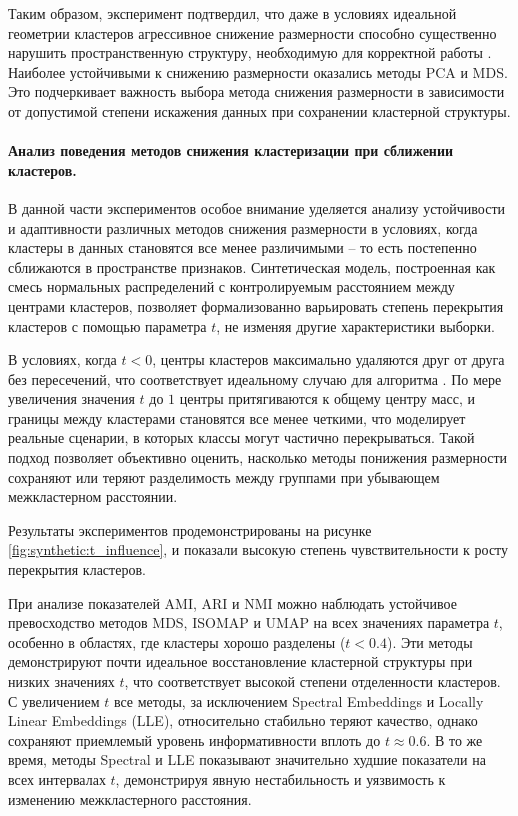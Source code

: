                 Таким образом, эксперимент подтвердил, что даже в условиях идеальной геометрии кластеров агрессивное снижение размерности способно существенно нарушить пространственную структуру, необходимую для корректной работы \kmeans{}. Наиболее устойчивыми к снижению размерности оказались методы PCA и MDS. Это подчеркивает важность выбора метода снижения размерности в зависимости от допустимой степени искажения данных при сохранении кластерной структуры.

            \paragraph{Анализ поведения методов снижения кластеризации при сближении кластеров.}
                В данной части экспериментов особое внимание уделяется анализу устойчивости и адаптивности различных методов снижения размерности в условиях, когда кластеры в данных становятся все менее различимыми -- то есть постепенно сближаются в пространстве признаков. Синтетическая модель, построенная как смесь нормальных распределений с контролируемым расстоянием между центрами кластеров, позволяет формализованно варьировать степень перекрытия кластеров с помощью параметра \(t\), не изменяя другие характеристики выборки.

                В условиях, когда \(t < 0\), центры кластеров максимально удаляются друг от друга без пересечений, что соответствует идеальному случаю для алгоритма \kmeans{}. По мере увеличения значения \(t\) до \(1\) центры притягиваются к общему центру масс, и границы между кластерами становятся все менее четкими, что моделирует реальные сценарии, в которых классы могут частично перекрываться. Такой подход позволяет объективно оценить, насколько методы понижения размерности сохраняют или теряют разделимость между группами при убывающем межкластерном расстоянии.

                Результаты экспериментов продемонстрированы на рисунке \ref{fig:synthetic:t_influence}, и показали высокую степень чувствительности к росту перекрытия кластеров.

                При анализе показателей AMI, ARI и NMI можно наблюдать устойчивое превосходство методов MDS, ISOMAP и UMAP на всех значениях параметра \(t\), особенно в областях, где кластеры хорошо разделены (\(t < 0.4\)). Эти методы демонстрируют почти идеальное восстановление кластерной структуры при низких значениях \(t\), что соответствует высокой степени отделенности кластеров. С увеличением \(t\) все методы, за исключением Spectral Embeddings и Locally Linear Embeddings (LLE), относительно стабильно теряют качество, однако сохраняют приемлемый уровень информативности вплоть до \(t \approx 0.6\). В то же время, методы Spectral и LLE показывают значительно худшие показатели на всех интервалах \(t\), демонстрируя явную нестабильность и уязвимость к изменению межкластерного расстояния.

